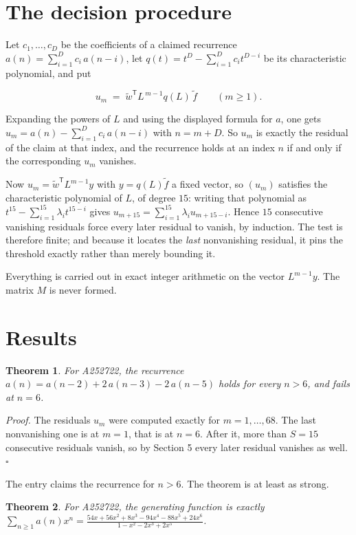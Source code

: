 \documentclass[11pt]{article}
\newtheorem{theorem}{Theorem}
\theoremstyle{definition}
\begin{document}
\section{The decision procedure}

Let $c_1,\dots,c_D$ be the coefficients of a claimed recurrence $a(n) = \sum_{i=1}^{D} c_i\,a(n-i)$, let $q(t) = t^{D} - \sum_{i=1}^{D} c_i t^{D-i}$ be its characteristic polynomial, and put

\[u_m \;=\; \tilde w^{\mathsf T} L^{\,m-1} q(L)\,\tilde f \qquad (m \ge 1).\]

Expanding the powers of $L$ and using the displayed formula for $a$, one gets $u_m = a(n) - \sum_{i=1}^{D} c_i\,a(n-i)$ with $n = m + D$. So $u_m$ is exactly the residual of the claim at that index, and the recurrence holds at an index $n$ if and only if the corresponding $u_m$ vanishes.

Now $u_m = \tilde w^{\mathsf T} L^{m-1} y$ with $y = q(L)\tilde f$ a fixed vector, so $(u_m)$ satisfies the characteristic polynomial of $L$, of degree $15$: writing that polynomial as $t^{15} - \sum_{i=1}^{15} \lambda_i t^{15-i}$ gives $u_{m+15} = \sum_{i=1}^{15} \lambda_i u_{m+15-i}$. Hence $15$ consecutive vanishing residuals force every later residual to vanish, by induction. The test is therefore finite; and because it locates the {\itshape last} nonvanishing residual, it pins the threshold exactly rather than merely bounding it.

Everything is carried out in exact integer arithmetic on the vector $L^{m-1}y$. The matrix $M$ is never formed.

\section{Results}

\begin{theorem} For A252722, the recurrence $a(n) = a(n-2) + 2\,a(n-3) - 2\,a(n-5)$ holds for every $n > 6$, and fails at $n = 6$.\end{theorem}

{\itshape Proof.} The residuals $u_m$ were computed exactly for $m = 1,\dots,68$. The last nonvanishing one is at $m = 1$, that is at $n = 6$. After it, more than $S = 15$ consecutive residuals vanish, so by Section 5 every later residual vanishes as well. $\square$

The entry claims the recurrence for $n > 6$. The theorem is at least as strong.

\begin{theorem} For A252722, the generating function is exactly $\sum_{n\ge 1} a(n)x^n = \frac{54x + 56x^{2} + 8x^{3} - 94x^{4} - 88x^{5} + 24x^{6}}{1 - x^{2} - 2x^{3} + 2x^{5}}$.\end{theorem}
\end{document}
